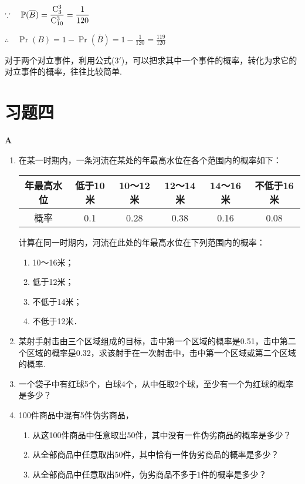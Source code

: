 $\because\quad \Pr(\overline{B})=\frac{{\rm C}_3^3}{{\rm C}_{10}^3}=\frac{1}{120}$

$\therefore\quad \Pr(B)=1-\Pr(\overline{B})=1-\frac{1}{120}=\frac{119}{120}$

\begin{rmk}
    对于两个对立事件，利用公式($3'$)，可以把求其中一个事件的概率，转化为求它的对立事件的概率，往往比较简单.
\end{rmk}

\section*{习题四}
\begin{center}
    \bfseries A
\end{center}
\begin{enumerate}
    \item 在某一时期内，一条河流在某处的年最高水位在各个范围内的概率如下：
\begin{center}
\begin{tabular}{c|ccccc}
    \hline
    年最高水位 &低于10米& 10～12米&12～14米&14～16米&不低于16米\\
    \hline
    概率& 0.1&0.28&0.38&0.16&0.08\\
    \hline
\end{tabular}
\end{center}
计算在同一时期内，河流在此处的年最高水位在下列范围内的概率：
\begin{multicols}{2}
\begin{enumerate}[(1)]
\item 10～16米；
\item 低于12米；
\item 不低于14米；
\item 不低于12米．
\end{enumerate}
\end{multicols}

\item 某射手射击由三个区域组成的目标，击中第一个区域的概率是0.51，击中第二个区域的概率是0.32，求该射手在一次射击中，击中第一个区域或第二个区域的概率.
\item 一个袋子中有红球5个，白球4个，从中任取2个球，至少有一个为红球的概率是多少？
\item 100件商品中混有5件伪劣商品，
\begin{enumerate}[(1)]
\item 从这100件商品中任意取出50件，其中没有一件伪劣商品的概率是多少？
\item 从全部商品中任意取出50件，其中恰有一件伪劣商品的概率是多少？
\item 从全部商品中任意取出50件，伪劣商品不多于1件的概率是多少？  
\end{enumerate}


\end{enumerate}
